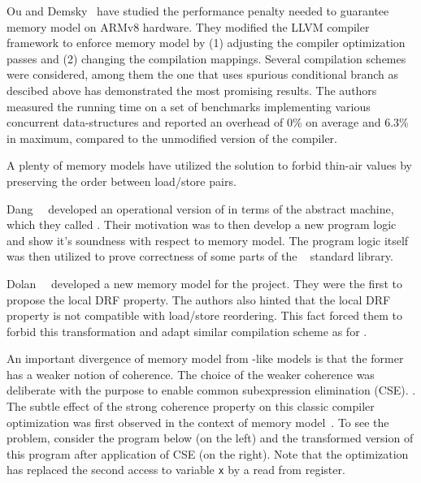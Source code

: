Ou and Demsky~\cite{Ou-Demsky:OOPSLA18} have studied 
the performance penalty needed to guarantee 
\RCMM memory model on ARMv8 hardware.
They modified the LLVM compiler framework 
to enforce \RCMM memory model
by (1) adjusting the compiler optimization passes and 
(2) changing the compilation mappings.
Several compilation schemes were considered,
among them the one that uses spurious conditional branch
as descibed above has demonstrated the most promising results.  
The authors measured the running time on a set of benchmarks 
implementing various concurrent data-structures
and reported an overhead of 0\% on average and 6.3\% in maximum,
compared to the unmodified version of the compiler. 

A plenty of memory models have utilized the \RCMM
solution to forbid thin-air values by 
preserving the order between load/store pairs. 

Dang~\etal~\cite{Dang-al:POPL19} developed an operational 
version of \RCMM in terms of the abstract machine, 
which they called \ORCMM. Their motivation was to 
then develop a new program logic and show it's soundness
with respect to \ORCMM memory model. 
The program logic itself was then utilized to 
prove correctness of some parts of 
the \Rust~\cite{RustBook:19} standard library.

Dolan~\etal~\cite{Dolan-al:PLDI18} developed a new 
memory model for the \MOCaml project. 
They were the first to propose the local DRF property. 
The authors also hinted that the local DRF property 
is not compatible with load/store reordering.
This fact forced them to forbid this transformation
and adapt similar compilation scheme as for \RCMM. 

An important divergence of \OCaml memory model 
from \CMM-like models is that the former 
has a weaker notion of coherence.
The choice of the weaker coherence was deliberate 
with the purpose to enable common subexpression elimination (CSE).
.
The subtle effect of the strong coherence property 
on this classic compiler optimization was first 
observed in the context of \Java 
memory model~\cite{Pugh:JAVA99}.
To see the problem, consider the program below
(on the left) and the transformed version 
of this program after application of CSE (on the right).
Note that the optimization has replaced 
the second access to variable \texttt{x}
by a read from register. 

